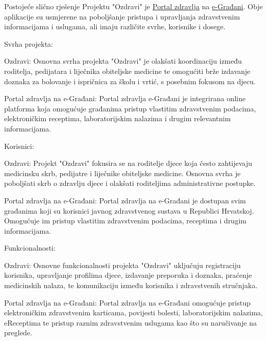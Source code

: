 Postojeće slično rješenje Projektu "Ozdravi" je \href{https://portal.zdravlje.hr/portalzdravlja/login.html}{Portal zdravlja} na \href{https://gov.hr}{e-Građani}. Obje aplikacije su usmjerene na poboljšanje pristupa i upravljanja zdravstvenim informacijama i uslugama, ali imaju različite svrhe, korisnike i dosege.
\begin{packed_enum}
    
\item Svrha projekta:
    \begin{packed_item}
   \item  Ozdravi: Osnovna svrha projekta "Ozdravi" je olakšati koordinaciju između roditelja, pedijatara i liječnika obiteljske medicine te omogućiti brže izdavanje doznaka za bolovanje i ispričnica za školu i vrtić, s posebnim fokusom na djecu.
   \item Portal zdravlja na e-Građani: Portal zdravlja e-Građani je integrirana online platforma koja omogućuje građanima pristup vlastitim zdravstvenim podacima, elektroničkim receptima, laboratorijskim nalazima i drugim relevantnim informacijama.
    \end{packed_item}
\item Korisnici:
    \begin{packed_item}
   \item Ozdravi: Projekt "Ozdravi" fokusira se na roditelje djece koja često zahtijevaju medicinsku skrb, pedijatre i liječnike obiteljske medicine. Osnovna svrha je poboljšati skrb o zdravlju djece i olakšati roditeljima administrativne postupke.
   \item Portal zdravlja na e-Građani: Portal zdravlja na e-Građani je dostupan svim građanima koji su korisnici javnog zdravstvenog sustava u Republici Hrvatskoj. Omogućuje im pristup vlastitim zdravstvenim podacima, receptima i drugim informacijama.
   \end{packed_item}

\item Funkcionalnosti:
    \begin{packed_item}
   \item Ozdravi: Osnovne funkcionalnosti projekta "Ozdravi" uključuju registraciju korisnika, upravljanje profilima djece, izdavanje preporuka i doznaka, praćenje medicinskih nalaza, te komunikaciju između korisnika i zdravstvenih stručnjaka.
   \item Portal zdravlja na e-Građani: Portal zdravlja na e-Građani omogućuje pristup elektroničkim zdravstvenim karticama, povijesti bolesti, laboratorijskim nalazima, eReceptima te pristup raznim zdravstvenim uslugama kao što su naručivanje na preglede.
   \end{packed_item}

\end{packed_enum}

